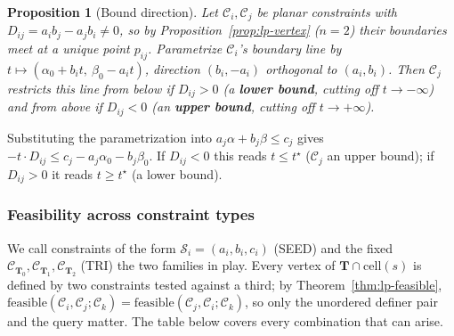 \documentclass[12pt]{article}
\makeatletter
\newtheorem{proposition}[theorem]{Proposition}
\theoremstyle{definition}
\theoremstyle{remark}
\renewenvironment{proof}[1][\proofname]{\par
  \pushQED{\qed}%
  \normalfont \footnotesize \topsep6\p@\@plus6\p@\relax
  \list{}{\leftmargin=2em
          \settowidth{\itemindent}{\itshape#1}%
          \labelwidth=\itemindent
          \parsep=0pt \listparindent=\parindent 
  }
  \item[\hskip\labelsep
        \itshape
    #1\@addpunct{.}]\ignorespaces
}{%
  \popQED\endlist\@endpefalse
}
\makeatother
\begin{document}
\begin{proposition}[Bound direction]\label{prop:bound-direction}
Let $\mathcal C_i,\mathcal C_j$ be planar constraints with $D_{ij} =
a_ib_j-a_jb_i \neq 0$, so by Proposition~\ref{prop:lp-vertex} ($n=2$) their
boundaries meet at a unique point $p_{ij}$. Parametrize $\mathcal C_i$'s
boundary line by $t\mapsto(\alpha_0+b_it,\ \beta_0-a_it)$, direction
$(b_i,-a_i)$ orthogonal to $(a_i,b_i)$. Then $\mathcal C_j$ restricts this
line from below if $D_{ij}>0$ (a \textbf{lower bound}, cutting off
$t\to-\infty$) and from above if $D_{ij}<0$ (an \textbf{upper bound}, cutting
off $t\to+\infty$).
\end{proposition}
\begin{proof}
Substituting the parametrization into $a_j\alpha+b_j\beta\le c_j$ gives
$-t\cdot D_{ij} \le c_j - a_j\alpha_0-b_j\beta_0$. If $D_{ij}<0$ this reads
$t\le t^\star$ ($\mathcal C_j$ an upper bound); if $D_{ij}>0$ it reads $t\ge
t^\star$ (a lower bound).
\end{proof}

\subsubsection*{Feasibility across constraint types}

We call constraints of the form $\mathcal S_i=(a_i,b_i,c_i)$ (SEED) and the
fixed $\mathcal C_{\mathbf T_0},\mathcal C_{\mathbf T_1},\mathcal C_{\mathbf
T_2}$ (TRI) the two families in play. Every vertex of $\mathbf T \cap
\mathrm{cell}(s)$ is defined by two constraints tested against a third; by
Theorem~\ref{thm:lp-feasible}, $\mathrm{feasible}(\mathcal C_i,\mathcal
C_j;\mathcal C_k) = \mathrm{feasible}(\mathcal C_j,\mathcal C_i;\mathcal
C_k)$, so only the unordered definer pair and the query matter. The table
below covers every combination that can arise.
\end{document}
